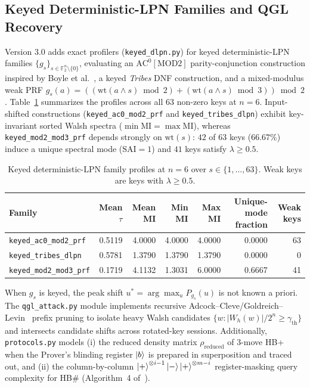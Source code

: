 \documentclass[10pt,twocolumn]{article}
\theoremstyle{definition}
\begin{document}
\subsection{Keyed Deterministic-LPN Families and QGL Recovery}\label{sec:keyed}

Version 3.0 adds exact profilers (\texttt{keyed\_dlpn.py}) for keyed deterministic-LPN families $\{g_s\}_{s \in \mathbb{F}_2^n \setminus \{0\}}$, evaluating an $\mathrm{AC}^0[\mathrm{MOD2}]$ parity-conjunction construction inspired by Boyle et al.~\cite{boyle2021}, a keyed \emph{Tribes} DNF construction, and a mixed-modulus weak PRF $g_s(a) = ((\mathrm{wt}(a \wedge s) \bmod 2) + (\mathrm{wt}(a \wedge s) \bmod 3)) \bmod 2$. Table~\ref{tab:keyed} summarizes the profiles across all $63$ non-zero keys at $n=6$. Input-shifted constructions (\texttt{keyed\_ac0\_mod2\_prf} and \texttt{keyed\_tribes\_dlpn}) exhibit key-invariant sorted Walsh spectra ($\min \mathrm{MI} = \max \mathrm{MI}$), whereas \texttt{keyed\_mod2\_mod3\_prf} depends strongly on $\mathrm{wt}(s)$: $42$ of $63$ keys ($66.67\%$) induce a unique spectral mode ($\mathrm{SAI}=1$) and $41$ keys satisfy $\lambda \geq 0.5$.

\begin{table}[t]
\centering
\caption{Keyed deterministic-LPN family profiles at $n=6$ over $s \in \{1,\ldots,63\}$. Weak keys are keys with $\lambda \geq 0.5$.}
\label{tab:keyed}
\begin{tabular}{lrrrrrr}
\toprule
Family & Mean $\tau$ & Mean MI & Min MI & Max MI &
Unique-mode fraction & Weak keys \\
\midrule
\texttt{keyed\_ac0\_mod2\_prf} & 0.5119 & 4.0000 & 4.0000 & 4.0000 & 0.0000 & 63 \\
\texttt{keyed\_tribes\_dlpn} & 0.5781 & 1.3790 & 1.3790 & 1.3790 & 0.0000 & 0 \\
\texttt{keyed\_mod2\_mod3\_prf} & 0.1719 & 4.1132 & 1.3031 & 6.0000 & 0.6667 & 41 \\
\bottomrule
\end{tabular}
\end{table}

When $g_s$ is keyed, the peak shift $u^* = \arg\max_u P_{g_s}(u)$ is not known a priori. The \texttt{qgl\_attack.py} module implements recursive Adcock--Cleve/Goldreich--Levin~\cite{adcock2002} prefix pruning to isolate heavy Walsh candidates $\{w : |W_h(w)|/2^n \geq \gamma_{\mathrm{th}}\}$ and intersects candidate shifts across rotated-key sessions. Additionally, \texttt{protocols.py} models (i) the reduced density matrix $\rho_{\mathrm{reduced}}$ of 3-move HB+ when the Prover's blinding register $\ket{b}$ is prepared in superposition and traced out, and (ii) the column-by-column $\ket{+}^{\otimes i-1}\ket{-}\ket{+}^{\otimes m-i}$ register-masking query complexity for HB\# (Algorithm~4 of~\cite{cid2026}).
\end{document}
